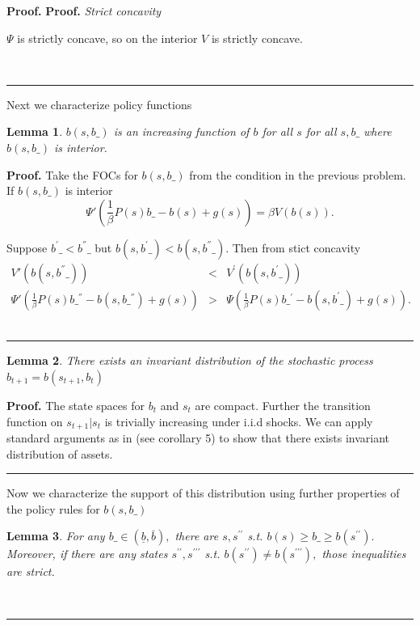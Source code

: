 \documentclass[thmsb,11pt]{article}
\newtheorem{lemma}{Lemma}
\newenvironment{proof}[1][Proof]{\noindent \textbf{#1.} }{\  \rule{0.5em}{0.5em}}
\begin{document}
\begin{proof}
\begin{proof}
\textit{Strict concavity}

$\Psi $ is strictly concave, so on the interior $V$ is strictly
concave.

\end{proof}

\smallskip Next we characterize policy functions

\begin{lemma}
\label{lem increasing b}
$b\left( s,b\_\right) $ is an increasing function of $b$ for all $s$ for all $%
s,b\_ $ where $b( s,b\_) $ is interior.
\end{lemma}

\begin{proof}
Take the FOCs for $b( s,b\_) $ from the condition in the previous
problem. If $b\left( s,b\_\right) $ is interior%
\[
\Psi' \left( \frac{1}{\beta }P\left( s\right) b\_-b\left( s\right)
+g\left( s\right) \right) =\beta V\left( b\left( s\right)
\right) .
\]

Suppose $b^{'}\_<b^{''}\_$ but $b\left( s,b^{'}\_\right) <b\left( s,b^{''}\_\right) .$
Then from stict concavity%
\begin{eqnarray*}
V'\left( b\left( s,b^{''}\_\right) \right) &<&V^{\prime
}\left( b\left( s,b^{'}\_\right) \right) \\
\Psi' \left( \frac{1}{\beta }P\left( s\right) b\_^{''}-b\left(
s,b\_^{''}\right) +g\left( s\right) \right) &>&\Psi \left( \frac{1}{\beta }%
P\left( s\right) b\_^{'}-b\left( s,b^{'}\_\right) +g\left( s\right) \right) .
\end{eqnarray*}
\end{proof}

\begin{lemma}
There exists an invariant distribution of the stochastic process $b_{t+1}=b(s_{t+1},b_t)$
\end{lemma}
\begin{proof}
The state spaces for $b_t$ and $s_t$ are compact. Further the transition function on $s_{t+1}|s_{t}$ is trivially increasing under i.i.d shocks. We can apply standard arguments as in \citet{Prescott1992}(see corollary 5) to show that there exists invariant distribution of assets.
\end{proof}

Now we characterize the support of this distribution using further properties of the policy rules for $b(s,b\_)$


\begin{lemma}
\label{prop: b(s) relative to b}For any $b\_\in (\underline{b} ,\bar{b}),$ there are $s,s^{\prime \prime }$ s.t. $b\left( s\right) \geq b\_\geq b\left( s^{\prime \prime }\right) .$ Moreover, if there are any states $s^{\prime \prime },s^{\prime \prime \prime }$ s.t. $b\left( s^{\prime \prime
}\right) \neq b\left( s^{\prime \prime \prime }\right) ,$ those inequalities
are strict.
\end{lemma}



\end{proof}
\end{document}
